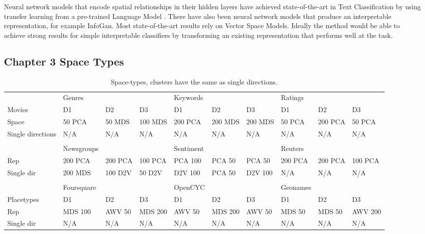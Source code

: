  Neural network models that encode spatial relationships in their hidden layers have achieved state-of-the-art in Text Classification by using transfer learning from a pre-trained Language Model \cite{Gong2018}. There have also been neural network models that produce an interpretable representation, for example InfoGan.
 Most state-of-the-art results rely on Vector Space Models. Ideally the method would be able to achieve strong results for simple interpretable classifiers by transforming an existing representation that performs well at the task.
 

\subsection{Chapter 3 Space Types}
\begin{landscape}
	\begin{table}[]
		\begin{tabular}{llllllllll}
			& Genres     &         &         & Keywords  &         &         & Ratings  &         &         \\
			Movies            & D1         & D2      & D3      & D1        & D2      & D3      & D1       & D2      & D3      \\
			Space             & 50 PCA     & 50 MDS  & 100 MDS & 200 PCA   & 200 MDS & 200 MDS & 50 PCA   & 200 PCA & 50 PCA  \\
			Single directions & N/A        & N/A     & N/A     & N/A       & N/A     & N/A     & N/A      & N/A     & N/A     \\
			&            &         &         &           &         &         &          &         &         \\
			& Newsgroups &         &         & Sentiment &         &         & Reuters  &         &         \\
			Rep               & 200 PCA    & 200 PCA & 100 PCA & PCA 100   & PCA 50  & PCA 50  & 200 PCA  & 200 PCA & 100 PCA \\
			Single dir        & 200 MDS    & 100 D2V & 50 D2V  & D2V 100   & PCA 50  & D2V 100 & N/A      & N/A     & N/A     \\
			&            &         &         &           &         &         &          &         &         \\
			& Foursquare &         &         & OpenCYC   &         &         & Geonames &         &         \\
			Placetypes        & D1         & D2      & D3      & D1        & D2      & D3      & D1       & D2      & D3      \\
			Rep               & MDS 100    & AWV 50  & MDS 200 & AWV 50    & MDS 200 & AWV 50  & MDS 50   & MDS 50  & AWV 200 \\
			Single dir        & N/A        & N/A     & N/A     & N/A       & N/A     & N/A     & N/A      & N/A     & N/A    
		\end{tabular}\caption{Space-types, clusters have the same as single directions.}
	\end{table}
\end{landscape}




